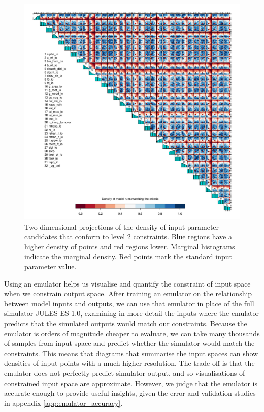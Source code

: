 \documentclass[gmd, manuscript]{copernicus}
\begin{document}
\begin{figure}[t]
\includegraphics[width=12cm]{./figs/fig06.pdf}
\caption{Two-dimensional projections of the density of input parameter candidates that conform to level 2 constraints. Blue regions have a higher density of points and red regions lower. Marginal histograms indicate the marginal density. Red points mark the standard input parameter value.}
\label{fig:pairs_level2_ix_em_unif_wave00_wave01}
\end{figure}

Using an emulator helps us visualise and quantify the constraint of input space when we constrain output space. After training an emulator on the relationship between model inputs and outputs, we can use that emulator in place of the full simulator JULES-ES-1.0, examining in more detail the inputs where the emulator predicts that the simulated outputs would match our constraints. Because the emulator is orders of magnitude cheaper to evaluate, we can take many thousands of samples from input space and predict whether the simulator would match the constraints. This means that diagrams that summarise the input spaces can show densities of input points with a much higher resolution. The trade-off is that the emulator does not perfectly predict simulator output, and so visualisations of constrained input space are approximate. However, we judge that the emulator is accurate enough to provide useful insights, given the error and validation studies in appendix \ref{app:emulator_accuracy}.
\end{document}
